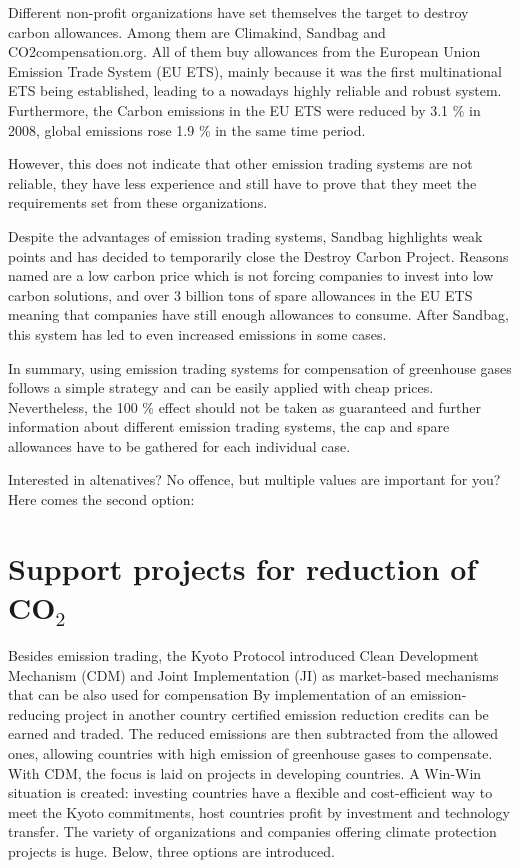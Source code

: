 Different non-profit organizations have set themselves the target to destroy carbon allowances. Among them are Climakind, Sandbag and CO2compensation.org. All of them buy allowances from the European Union Emission Trade System (EU ETS), mainly because it was the first multinational ETS being established, leading to a nowadays highly reliable and robust system. Furthermore, the Carbon emissions in the EU ETS were reduced by 3.1 \% in 2008, global emissions rose 1.9 \% in the same time period. 
\cite{climakind_2} %

However, this does not indicate that other emission trading systems are not reliable, they have less experience and still have to prove that they meet the requirements set from these organizations. 

Despite the advantages of emission trading systems, Sandbag highlights weak points and has decided to temporarily close the Destroy Carbon Project. Reasons named are a low carbon price which is not forcing companies to invest into low carbon solutions, and over 3 billion tons of spare allowances in the EU ETS meaning that companies have still enough allowances to consume. After Sandbag, this system has led to even increased emissions in some cases.


In summary, using emission trading systems for compensation of greenhouse gases follows a simple strategy and can be easily applied with cheap prices. Nevertheless, the 100 \% effect should not be taken as guaranteed and further information about different emission trading systems, the cap and spare allowances have to be gathered for each individual case. 


Interested in altenatives? No offence, but multiple values are important for you? Here comes the second option:

\section{Support projects for reduction of CO$_2$}	

Besides emission trading, the Kyoto Protocol introduced Clean Development Mechanism (CDM) and Joint Implementation (JI) as market-based mechanisms that can be also used for compensation \cite{unfccc} %
By implementation of an emission-reducing project in another country certified emission reduction credits can be earned and traded. The reduced emissions are then subtracted from the allowed ones, allowing countries with high emission of greenhouse gases to compensate. With CDM, the focus is laid on projects in developing countries. A Win-Win situation is created: investing countries have a flexible and cost-efficient way to meet the Kyoto commitments, host countries profit by investment and technology transfer.
The variety of organizations and companies offering climate protection projects is huge. Below, three options are introduced.

